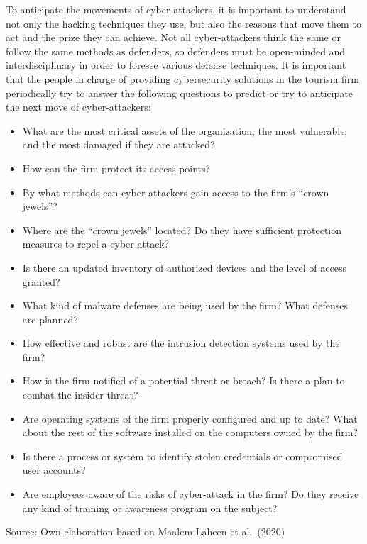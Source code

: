 \documentclass[
  letterpaper,
  DIV=11,
  numbers=noendperiod]{scrreprt}
\begin{document}
\begin{tcolorbox}[enhanced jigsaw, title=\textcolor{quarto-callout-note-color}{\faInfo}\hspace{0.5em}{In the Mind of Cyber-Attackers}, colframe=quarto-callout-note-color-frame, arc=.35mm, colbacktitle=quarto-callout-note-color!10!white, rightrule=.15mm, titlerule=0mm, toptitle=1mm, opacitybacktitle=0.6, bottomtitle=1mm, colback=white, leftrule=.75mm, bottomrule=.15mm, breakable, left=2mm, toprule=.15mm, opacityback=0, coltitle=black]

To anticipate the movements of cyber-attackers, it is important to
understand not only the hacking techniques they use, but also the
reasons that move them to act and the prize they can achieve. Not all
cyber-attackers think the same or follow the same methods as defenders,
so defenders must be open-minded and interdisciplinary in order to
foresee various defense techniques. It is important that the people in
charge of providing cybersecurity solutions in the tourism firm
periodically try to answer the following questions to predict or try to
anticipate the next move of cyber-attackers:

\begin{itemize}
\item
  What are the most critical assets of the organization, the most
  vulnerable, and the most damaged if they are attacked?
\item
  How can the firm protect its access points?
\item
  By what methods can cyber-attackers gain access to the firm's ``crown
  jewels''?
\item
  Where are the ``crown jewels'' located? Do they have sufficient
  protection measures to repel a cyber-attack?
\item
  Is there an updated inventory of authorized devices and the level of
  access granted?
\item
  What kind of malware defenses are being used by the firm? What
  defenses are planned?
\item
  How effective and robust are the intrusion detection systems used by
  the firm?
\item
  How is the firm notified of a potential threat or breach? Is there a
  plan to combat the insider threat?
\item
  Are operating systems of the firm properly configured and up to date?
  What about the rest of the software installed on the computers owned
  by the firm?
\item
  Is there a process or system to identify stolen credentials or
  compromised user accounts?
\item
  Are employees aware of the risks of cyber-attack in the firm? Do they
  receive any kind of training or awareness program on the subject?
\end{itemize}

Source: Own elaboration based on Maalem Lahcen et al.~(2020)

\end{tcolorbox}
\end{document}

